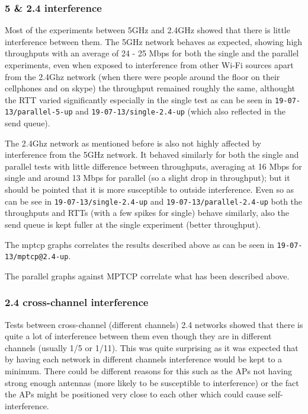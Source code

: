 \documentclass[12pt,a4paper]{article}
\begin{document}
\subsubsection{5 \& 2.4 interference}
Most of the experiments between 5GHz and 2.4GHz showed that there is little
interference between them. The 5GHz network behaves as expected, showing high
throughputs with an average of 24 - 25 Mbps  for both the single and the
parallel experiments, even when exposed to interference from other Wi-Fi sources
apart from the 2.4Ghz network (when there were people around the floor on their
cellphones and on skype) the throughput remained roughly the same, althought the
RTT varied significantly especially in the single test as can be seen in
\texttt{19-07-13/parallel-5-up} and \texttt{19-07-13/single-2.4-up} (which also
reflected in the send queue).

The 2.4Ghz network as mentioned before is also not highly affected by
interference from the 5GHz network. It behaved similarly for both the single and
parallel tests with little difference between throughputs, averaging at 16 Mbps
for single and around 13 Mbps for parallel (so a slight drop in throughput); but
it should be pointed that it is more susceptible to outside interference. Even
so as can be see in \texttt{19-07-13/single-2.4-up} and
\texttt{19-07-13/parallel-2.4-up} both the throughputs and RTTs (with a few
spikes for single) behave similarly, also the send queue is kept fuller at the
single experiment (better throughput).

The mptcp graphs correlates the results described above as can be seen in
\texttt{19-07-13/mptcp@2.4-up}.

The parallel graphs against MPTCP correlate what has been described above.

\subsubsection{2.4 cross-channel interference}
Tests between cross-channel (different channels) 2.4 networks showed that there
is quite a lot of interference between them even though they are in different
channels (usually 1/5 or 1/11). This was quite surprising as it was expected
that by having each network in different channels interference would be kept to
a minimum. There could be different reasons for this such as the APs not having
strong enough antennas (more likely to be susceptible to interference) or the
fact the APs might be positioned very close to each other which could cause
self-interference.
\end{document}
